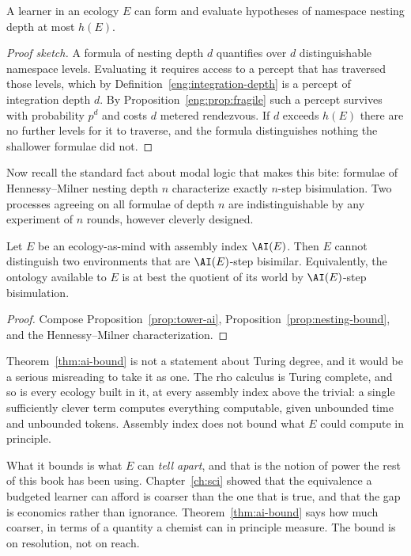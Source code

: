 \begin{proposition}
\label{prop:nesting-bound}
A learner in an ecology $E$ can form and evaluate hypotheses of namespace
nesting depth at most $h(E)$.
\end{proposition}

\begin{proof}[Proof sketch]
A formula of nesting depth $d$ quantifies over $d$ distinguishable
namespace levels.
Evaluating it requires access to a percept that has traversed those
levels, which by Definition~\ref{eng:integration-depth} is a percept of
integration depth $d$.
By Proposition~\ref{eng:prop:fragile} such a percept survives with
probability $p^d$ and costs $d$ metered rendezvous.
If $d$ exceeds $h(E)$ there are no further levels for it to traverse, and
the formula distinguishes nothing the shallower formulae did not.
\end{proof}

Now recall the standard fact about modal logic that makes this bite:
formulae of Hennessy--Milner nesting depth $n$ characterize exactly
$n$-step bisimulation.
Two processes agreeing on all formulae of depth $n$ are indistinguishable
by any experiment of $n$ rounds, however cleverly designed.

\begin{theorem}
\label{thm:ai-bound}
Let $E$ be an ecology-as-mind with assembly index $\AI(E)$.
Then $E$ cannot distinguish two environments that are
$\AI(E)$-step bisimilar.
Equivalently, the ontology available to $E$ is at best the quotient of
its world by $\AI(E)$-step bisimulation.
\end{theorem}

\begin{proof}
Compose Proposition~\ref{prop:tower-ai}, Proposition~\ref{prop:nesting-bound},
and the Hennessy--Milner characterization.
\end{proof}

\begin{remark}
\label{rmk:power-caveat}
Theorem~\ref{thm:ai-bound} is not a statement about Turing degree, and it
would be a serious misreading to take it as one.
The rho calculus is Turing complete, and so is every ecology built in it,
at every assembly index above the trivial: a single sufficiently clever
term computes everything computable, given unbounded time and unbounded
tokens.
Assembly index does not bound what $E$ could compute in principle.

What it bounds is what $E$ can \emph{tell apart}, and that is the notion
of power the rest of this book has been using.
Chapter~\ref{ch:sci} showed that the equivalence a budgeted learner can
afford is coarser than the one that is true, and that the gap is
economics rather than ignorance.
Theorem~\ref{thm:ai-bound} says how much coarser, in terms of a quantity
a chemist can in principle measure.
The bound is on resolution, not on reach.
\end{remark}

